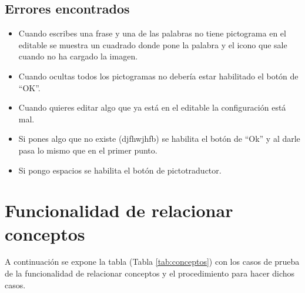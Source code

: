 \subsection{Errores encontrados}
\label{errores:pictotra}
\begin{itemize}
    \item Cuando escribes una frase y una de las palabras no tiene pictograma en el editable se muestra un cuadrado donde pone la palabra y el icono que sale cuando no ha cargado la imagen.
    \item Cuando ocultas todos los pictogramas no debería estar habilitado el botón de ``OK''.
    \item  Cuando quieres editar algo que ya está en el editable la configuración está mal.
    \item Si pones algo que no existe (djfhwjhfb) se habilita el botón de ``Ok'' y al darle pasa lo mismo que en el primer punto.
    \item  Si pongo espacios se habilita el botón de pictotraductor.
\end{itemize}


\section{Funcionalidad de relacionar conceptos}
\label{planPruebas:conceptos}
A continuación se expone la tabla (Tabla \ref{tab:conceptos}) con los casos de prueba de la funcionalidad de relacionar conceptos y el procedimiento para hacer dichos casos.

